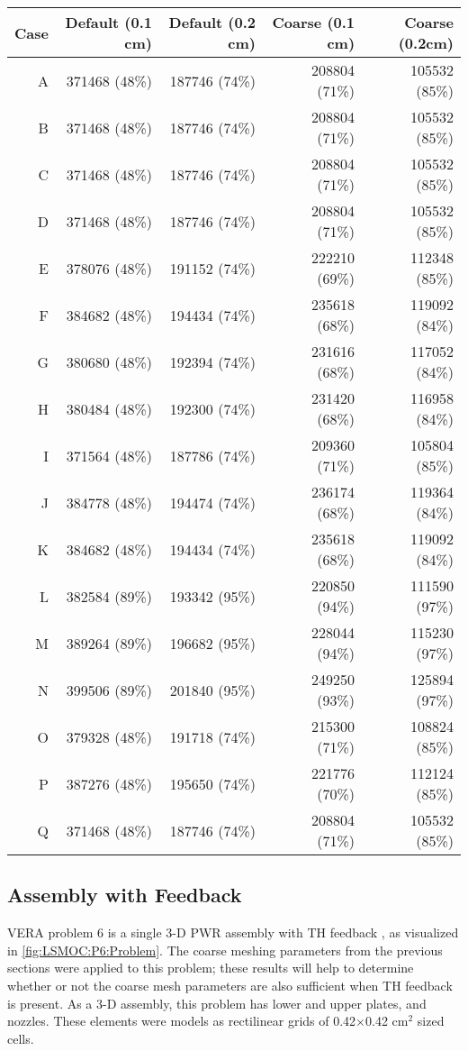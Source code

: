 {{{{\begin{table}[htbp]
\begin{tabular}{rrrrr}
             Case & Default (0.1 cm) & Default (0.2 cm) & Coarse (0.1 cm) & Coarse (0.2cm)\\\midrule
              A   & 371468 (48\%) & 187746 (74\%) & 208804 (71\%) & 105532 (85\%)\\
              B   & 371468 (48\%) & 187746 (74\%) & 208804 (71\%) & 105532 (85\%)\\
              C   & 371468 (48\%) & 187746 (74\%) & 208804 (71\%) & 105532 (85\%)\\
              D   & 371468 (48\%) & 187746 (74\%) & 208804 (71\%) & 105532 (85\%)\\
              E   & 378076 (48\%) & 191152 (74\%) & 222210 (69\%) & 112348 (85\%)\\
              F   & 384682 (48\%) & 194434 (74\%) & 235618 (68\%) & 119092 (84\%)\\
              G   & 380680 (48\%) & 192394 (74\%) & 231616 (68\%) & 117052 (84\%)\\
              H   & 380484 (48\%) & 192300 (74\%) & 231420 (68\%) & 116958 (84\%)\\
              I   & 371564 (48\%) & 187786 (74\%) & 209360 (71\%) & 105804 (85\%)\\
              J   & 384778 (48\%) & 194474 (74\%) & 236174 (68\%) & 119364 (84\%)\\
              K   & 384682 (48\%) & 194434 (74\%) & 235618 (68\%) & 119092 (84\%)\\
              L   & 382584 (89\%) & 193342 (95\%) & 220850 (94\%) & 111590 (97\%)\\
              M   & 389264 (89\%) & 196682 (95\%) & 228044 (94\%) & 115230 (97\%)\\
              N   & 399506 (89\%) & 201840 (95\%) & 249250 (93\%) & 125894 (97\%)\\
              O   & 379328 (48\%) & 191718 (74\%) & 215300 (71\%) & 108824 (85\%)\\
              P   & 387276 (48\%) & 195650 (74\%) & 221776 (70\%) & 112124 (85\%)\\
              Q   & 371468 (48\%) & 187746 (74\%) & 208804 (71\%) & 105532 (85\%)\\\bottomrule
          \end{tabular}
        \end{table}
      }
    }

    \subsection{Assembly with Feedback}{\label{ssec:LSMOC:Assembly with Feedback}
      \ac{VERA} problem 6 is a single 3-D \ac{PWR} assembly with \ac{TH} feedback \cite{VERAProblems}, as visualized in \cref{fig:LSMOC:P6:Problem}.
      The coarse meshing parameters from the previous sections were applied to this problem;
        these results will help to determine whether or not the coarse mesh parameters are also sufficient when \ac{TH} feedback is present.
      As a 3-D assembly, this problem has lower and upper plates, and nozzles.
      These elements were models as rectilinear grids of 0.42$\times$0.42 cm$^2$ sized cells.

}}}
